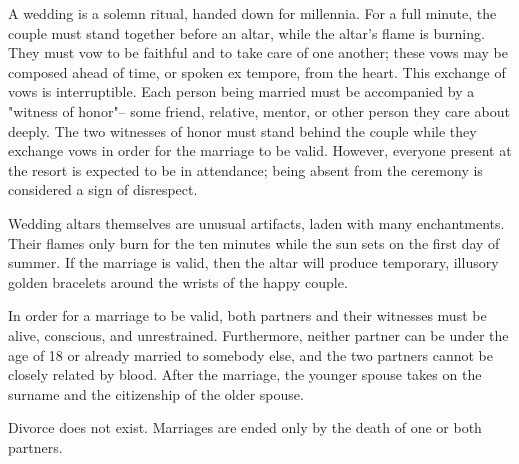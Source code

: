 \documentclass[green]{Kos}
\begin{document}
\name{\gWedding{}}

A wedding is a solemn ritual, handed down for millennia. For a full minute, the couple must stand together before an altar, while the altar's flame is burning. They must vow to be faithful and to take care of one another; these vows may be composed ahead of time, or spoken ex tempore, from the heart. This exchange of vows is interruptible. Each person being married must be accompanied by a "witness of honor"-- some friend, relative, mentor, or other person they care about deeply. The two witnesses of honor must stand behind the couple while they exchange vows in order for the marriage to be valid. However, everyone present at the resort is expected to be in attendance; being absent from the ceremony is considered a sign of disrespect.

Wedding altars themselves are unusual artifacts, laden with many enchantments. Their flames only burn for the ten minutes while the sun sets on the first day of summer. If the marriage is valid, then the altar will produce temporary, illusory golden bracelets around the wrists of the happy couple.

In order for a marriage to be valid, both partners and their witnesses must be alive, conscious, and unrestrained. Furthermore, neither partner can be under the age of 18 or already married to somebody else, and the two partners cannot be closely related by blood. After the marriage, the younger spouse takes on the surname and the citizenship of the older spouse.

Divorce does not exist. Marriages are ended only by the death of one or both partners.
\end{document}
